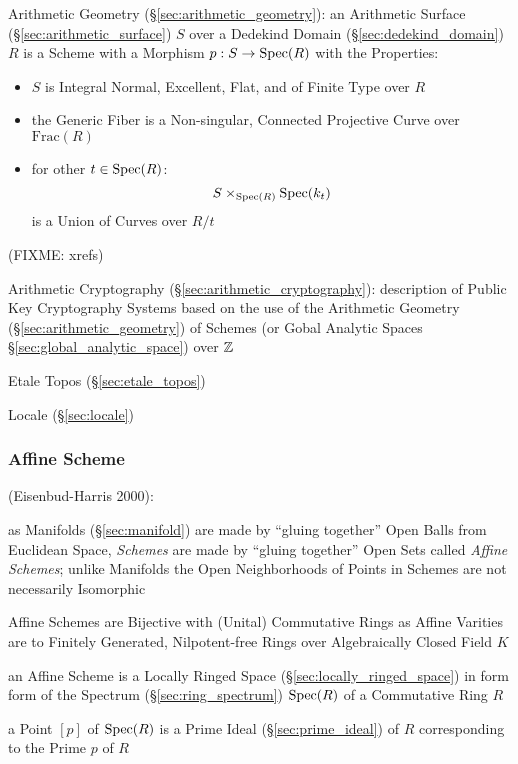 \asterism

\fist Arithmetic Geometry (\S\ref{sec:arithmetic_geometry}): an Arithmetic
Surface (\S\ref{sec:arithmetic_surface}) $S$ over a Dedekind Domain
(\S\ref{sec:dedekind_domain}) $R$ is a Scheme with a Morphism $p : S \rightarrow
\mathrm{Spec}(R)$ with the Properties:
\begin{itemize}
  \item $S$ is Integral Normal, Excellent, Flat, and of Finite Type over $R$
  \item the Generic Fiber is a Non-singular, Connected Projective Curve over
    $\mathrm{Frac}(R)$
  \item for other $t \in \mathrm{Spec}(R)$:
    \[
      S \times_{\mathrm{Spec}(R)} \mathrm{Spec}(k_t)
    \]
    is a Union of Curves over $R / t$
\end{itemize}
(FIXME: xrefs)

\fist Arithmetic Cryptography (\S\ref{sec:arithmetic_cryptography}):
description of Public Key Cryptography Systems based on the use of the
Arithmetic Geometry (\S\ref{sec:arithmetic_geometry}) of Schemes (or Gobal
Analytic Spaces \S\ref{sec:global_analytic_space}) over $\mathbb{Z}$

Etale Topos (\S\ref{sec:etale_topos})

Locale (\S\ref{sec:locale})



\subsubsection{Affine Scheme}\label{sec:affine_scheme}

(Eisenbud-Harris 2000):

as Manifolds (\S\ref{sec:manifold}) are made by ``gluing together'' Open Balls
from Euclidean Space, \emph{Schemes} are made by ``gluing together'' Open Sets
called \emph{Affine Schemes}; unlike Manifolds the Open Neighborhoods of Points
in Schemes are not necessarily Isomorphic

Affine Schemes are Bijective with (Unital) Commutative Rings as Affine Varities
are to Finitely Generated, Nilpotent-free Rings over Algebraically Closed Field
$K$

an Affine Scheme is a Locally Ringed Space (\S\ref{sec:locally_ringed_space}) in
form form of the Spectrum (\S\ref{sec:ring_spectrum}) $\mathrm{Spec}(R)$ of a
Commutative Ring $R$

a Point $[p]$ of $\mathrm{Spec}(R)$ is a Prime Ideal (\S\ref{sec:prime_ideal}) of $R$
corresponding to the Prime $p$ of $R$

